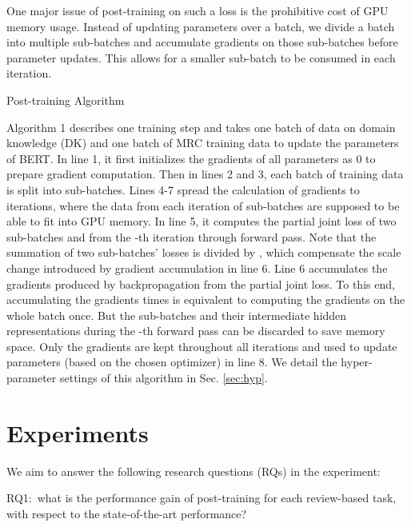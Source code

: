 \documentclass[11pt,a4paper]{article}
\begin{document}
One major issue of post-training on such a loss is the prohibitive cost of GPU memory usage.
Instead of updating parameters over a batch, we divide a batch into multiple sub-batches and accumulate gradients on those sub-batches before parameter updates. This allows for a smaller sub-batch to be consumed in each iteration.

\begin{algorithm}
\label{alg:pre-tuning}
\LinesNumbered
\DontPrintSemicolon
\caption{Post-training Algorithm}
\BlankLine
 \;
 \;
 \;
\For{ }{
     \;
    \;
}
 \;
\end{algorithm}

Algorithm 1 describes one training step and takes one batch of data on domain knowledge (DK)  and one batch of MRC training data  to update the parameters  of BERT.
In line 1, it first initializes the gradients  of all parameters as 0 to prepare gradient computation. Then in lines 2 and 3, each batch of training data is split into  sub-batches. Lines 4-7 spread the calculation of gradients to  iterations, where the data from each iteration of sub-batches are supposed to be able to fit into GPU memory.
In line 5, it computes the partial joint loss  of two sub-batches  and  from the -th iteration through forward pass.
Note that the summation of two sub-batches' losses is divided by , which compensate the scale change introduced by gradient accumulation in line 6.
Line 6 accumulates the gradients produced by backpropagation from the partial joint loss. To this end, accumulating the gradients  times is equivalent to computing the gradients on the whole batch once. But the sub-batches and their intermediate hidden representations during the -th forward pass can be discarded to save memory space.
Only the gradients  are kept throughout all iterations and used to update parameters (based on the chosen optimizer) in line 8.
We detail the hyper-parameter settings of this algorithm in Sec. \ref{sec:hyp}.

\section{Experiments}
\label{sec:exp}

We aim to answer the following research questions (RQs) in the experiment:

RQ1:~what is the performance gain of post-training for each review-based task, with respect to the state-of-the-art performance?
\end{document}
